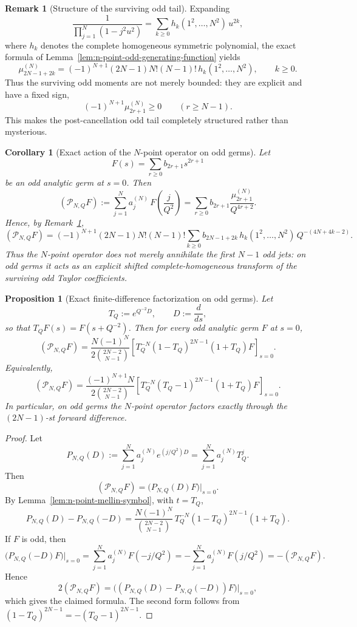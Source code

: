 \documentclass[11pt,a4paper]{amsart}
\theoremstyle{plain}
\newtheorem{proposition}[theorem]{Proposition}
\newtheorem{corollary}[theorem]{Corollary}
\theoremstyle{definition}
\newtheorem{remark}[theorem]{Remark}
\begin{document}
\begin{remark}[Structure of the surviving odd tail]
\label{rem:surviving-odd-tail-structure}
Expanding
\[
\frac{1}{\prod_{j=1}^N(1-j^2u^2)}
=
\sum_{k\ge 0} h_k(1^2,\dots,N^2)\,u^{2k},
\]
where $h_k$ denotes the complete homogeneous symmetric polynomial, the exact
formula of Lemma~\ref{lem:n-point-odd-generating-function} yields
\[
\mu_{2N-1+2k}^{(N)}
=
(-1)^{N+1}(2N-1)N!(N-1)!\,
h_k(1^2,\dots,N^2),
\qquad k\ge 0.
\]
Thus the surviving odd moments are not merely bounded: they are explicit and
have a fixed sign,
\[
(-1)^{N+1}\mu_{2r+1}^{(N)}\ge 0
\qquad (r\ge N-1).
\]
This makes the post-cancellation odd tail completely structured rather than
mysterious.
\end{remark}

\begin{corollary}[Exact action of the $N$-point operator on odd germs]
\label{cor:n-point-exact-odd-action}
Let
\[
F(s)=\sum_{r\ge 0} b_{2r+1}s^{2r+1}
\]
be an odd analytic germ at $s=0$. Then
\[
(\mathcal P_{N,Q}F)
:=
\sum_{j=1}^N a_j^{(N)}\,F\!\left(\frac{j}{Q^2}\right)
=
\sum_{r\ge 0} b_{2r+1}\frac{\mu_{2r+1}^{(N)}}{Q^{4r+2}}.
\]
Hence, by Remark~\ref{rem:surviving-odd-tail-structure},
\[
(\mathcal P_{N,Q}F)
=
(-1)^{N+1}(2N-1)N!(N-1)!
\sum_{k\ge 0}
b_{2N-1+2k}\,
h_k(1^2,\dots,N^2)\,
Q^{-(4N+4k-2)}.
\]
Thus the $N$-point operator does not merely annihilate the first $N-1$
odd jets: on odd germs it acts as an explicit shifted complete-homogeneous
transform of the surviving odd Taylor coefficients.
\end{corollary}

\begin{proposition}[Exact finite-difference factorization on odd germs]
\label{prop:n-point-odd-finite-difference-factorization}
Let
\[
T_Q:=e^{Q^{-2}D},
\qquad
D:=\frac{d}{ds},
\]
so that $T_QF(s)=F(s+Q^{-2})$. Then for every odd analytic germ
$F$ at $s=0$,
\[
(\mathcal P_{N,Q}F)
=
\frac{N(-1)^N}{2\binom{2N-2}{N-1}}
\left[
T_Q^{-N}(1-T_Q)^{2N-1}(1+T_Q)F
\right]_{s=0}.
\]
Equivalently,
\[
(\mathcal P_{N,Q}F)
=
\frac{(-1)^{N+1}N}{2\binom{2N-2}{N-1}}
\left[
T_Q^{-N}(T_Q-1)^{2N-1}(1+T_Q)F
\right]_{s=0}.
\]
In particular, on odd germs the $N$-point operator factors exactly through
the $(2N-1)$-st forward difference.
\end{proposition}

\begin{proof}
Let
\[
P_{N,Q}(D):=\sum_{j=1}^N a_j^{(N)}e^{(j/Q^2)D}
=\sum_{j=1}^N a_j^{(N)}T_Q^j.
\]
Then
\[
(\mathcal P_{N,Q}F)=\bigl(P_{N,Q}(D)F\bigr)\big|_{s=0}.
\]
By Lemma~\ref{lem:n-point-mellin-symbol}, with $t=T_Q$,
\[
P_{N,Q}(D)-P_{N,Q}(-D)
=
\frac{N(-1)^N}{\binom{2N-2}{N-1}}\,
T_Q^{-N}(1-T_Q)^{2N-1}(1+T_Q).
\]
If $F$ is odd, then
\[
\bigl(P_{N,Q}(-D)F\bigr)\big|_{s=0}
=
\sum_{j=1}^N a_j^{(N)}F(-j/Q^2)
=
-\sum_{j=1}^N a_j^{(N)}F(j/Q^2)
=
-(\mathcal P_{N,Q}F).
\]
Hence
\[
2(\mathcal P_{N,Q}F)
=
\bigl((P_{N,Q}(D)-P_{N,Q}(-D))F\bigr)\big|_{s=0},
\]
which gives the claimed formula. The second form follows from
$(1-T_Q)^{2N-1}=-(T_Q-1)^{2N-1}$.
\end{proof}
\end{document}
